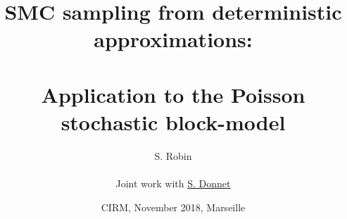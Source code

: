 \documentclass[9pt]{beamer}
\newcommand{\fignet}{/home/robin/RECHERCHE/RESEAUX/EXPOSES/FIGURES}
\begin{document}

\title[SMC sampling for Poisson SBM]{SMC sampling from deterministic approximations: \\ ~\\ Application to the Poisson stochastic block-model}

\author[S. Robin]{S. Robin \\ ~\\
    Joint work with \underline{S. Donnet}
  }


\date[Nov.'18, Marseille]{CIRM, November 2018, Marseille}

\maketitle

\end{document}
